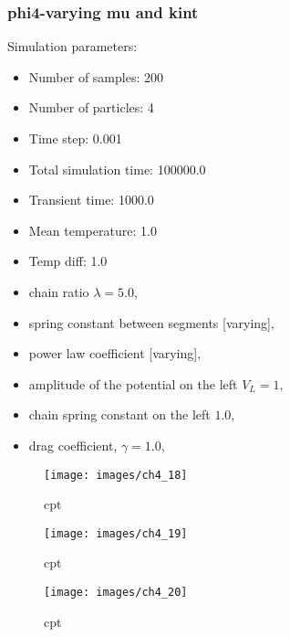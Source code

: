 \subsubsection{phi4-varying mu and kint}
Simulation parameters:
\begin{itemize}
	\item Number of samples: 200
	\item Number of particles: 4
	\item Time step: 0.001
	\item Total simulation time: 100000.0
	\item Transient time: 1000.0
	\item Mean temperature: 1.0
	\item Temp diff: 1.0
	\item chain ratio $ \lambda=5.0 $,
	\item spring constant between segments [varying],
	\item power law coefficient [varying],
	\item amplitude of the potential on the left $ V_{L}=1 $,
	\item chain spring constant on the left $ 1.0 $,
	\item drag coefficient, $ \gamma=1.0 $,
\end{itemize}

\begin{figure}[H]
	\centering
	\texttt{[image: images/ch4\_18]}
	\caption{cpt}
	\label{fig:ch4_18}
\end{figure}

\begin{figure}[H]
	\centering
	\texttt{[image: images/ch4\_19]}
	\caption{cpt}
	\label{fig:ch4_19}
\end{figure}

\begin{figure}[H]
	\centering
	\texttt{[image: images/ch4\_20]}
	\caption{cpt}
	\label{fig:ch4_20}
\end{figure}

